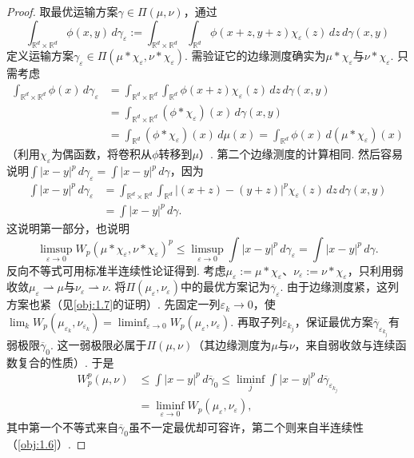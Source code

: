 \begin{proof}
取最优运输方案$\gamma\in\Pi(\mu,\nu)$，通过
\[
\int_{\mathbb R^d\times\mathbb R^d}\phi(x,y)\,d\gamma_\varepsilon
:=\int_{\mathbb R^d\times\mathbb R^d}\int_{\mathbb R^d}\phi(x+z,y+z)\chi_\varepsilon(z)\,dz\,d\gamma(x,y)
\]
定义运输方案$\gamma_\varepsilon\in\Pi(\mu*\chi_\varepsilon,\nu*\chi_\varepsilon)$.
需验证它的边缘测度确实为$\mu*\chi_\varepsilon$与$\nu*\chi_\varepsilon$. 只需考虑
\[
\begin{aligned}
\int_{\mathbb R^d\times\mathbb R^d}\phi(x)\,d\gamma_\varepsilon
&=\int_{\mathbb R^d\times\mathbb R^d}\int_{\mathbb R^d}\phi(x+z)\chi_\varepsilon(z)\,dz\,d\gamma(x,y)\\
&=\int_{\mathbb R^d\times\mathbb R^d}(\phi*\chi_\varepsilon)(x)\,d\gamma(x,y)\\
&=\int_{\mathbb R^d}(\phi*\chi_\varepsilon)(x)\,d\mu(x)
=\int_{\mathbb R^d}\phi(x)\,d(\mu*\chi_\varepsilon)(x)
\end{aligned}
\]
（利用$\chi_\varepsilon$为偶函数，将卷积从$\phi$转移到$\mu$）. 第二个边缘测度的计算相同. 然后容易说明$\int|x-y|^p\,d\gamma_\varepsilon=\int|x-y|^p\,d\gamma$，因为
\[
\begin{aligned}
\int|x-y|^p\,d\gamma_\varepsilon
&=\int_{\mathbb R^d\times\mathbb R^d}\int_{\mathbb R^d}|(x+z)-(y+z)|^p\chi_\varepsilon(z)\,dz\,d\gamma(x,y)\\
&=\int|x-y|^p\,d\gamma.
\end{aligned}
\]
这说明第一部分，也说明
\[
\limsup_{\varepsilon\to0}W_p(\mu*\chi_\varepsilon,\nu*\chi_\varepsilon)^p
\le\limsup_{\varepsilon\to0}\int|x-y|^p\,d\gamma_\varepsilon=\int|x-y|^p\,d\gamma.
\]
反向不等式可用标准半连续性论证得到. 考虑$\mu_\varepsilon:=\mu*\chi_\varepsilon$、$\nu_\varepsilon:=\nu*\chi_\varepsilon$，只利用弱收敛$\mu_\varepsilon\rightharpoonup\mu$与$\nu_\varepsilon\rightharpoonup\nu$. 将$\Pi(\mu_\varepsilon,\nu_\varepsilon)$中的最优方案记为$\overline\gamma_\varepsilon$. 由于边缘测度紧，这列方案也紧（见\autoref{obj:1.7}的证明）. 先固定一列$\varepsilon_k\to0$，使$\lim_kW_p(\mu_{\varepsilon_k},\nu_{\varepsilon_k})=\liminf_{\varepsilon\to0}W_p(\mu_\varepsilon,\nu_\varepsilon)$. 再取子列$\varepsilon_{k_j}$，保证最优方案$\overline\gamma_{\varepsilon_{k_j}}$有弱极限$\overline\gamma_0$. 这一弱极限必属于$\Pi(\mu,\nu)$（其边缘测度为$\mu$与$\nu$，来自弱收敛与连续函数复合的性质）. 于是
\[
\begin{aligned}
W_p^p(\mu,\nu)&\le\int|x-y|^p\,d\overline\gamma_0
\le\liminf_j\int|x-y|^p\,d\overline\gamma_{\varepsilon_{k_j}}\\
&=\liminf_{\varepsilon\to0}W_p(\mu_\varepsilon,\nu_\varepsilon),
\end{aligned}
\]
其中第一个不等式来自$\overline\gamma_0$虽不一定最优却可容许，第二个则来自半连续性（\autoref{obj:1.6}）.
\end{proof}


